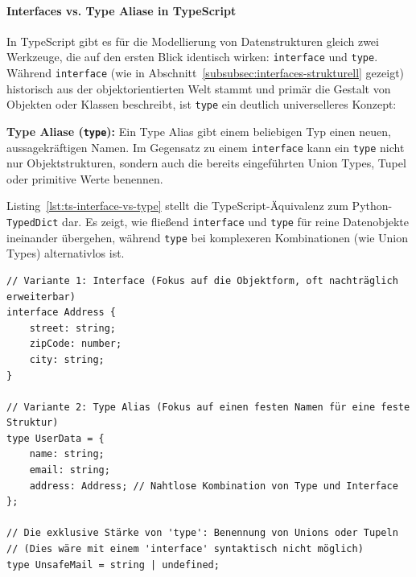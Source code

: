 \paragraph{Interfaces vs. Type Aliase in TypeScript}
\label{par:ts-interface-vs-type}

In TypeScript gibt es für die Modellierung von Datenstrukturen gleich zwei Werkzeuge, die auf den ersten Blick identisch wirken: \texttt{interface} und \texttt{type}. Während \texttt{interface} (wie in Abschnitt~\ref{subsubsec:interfaces-strukturell} gezeigt) historisch aus der objektorientierten Welt stammt und primär die Gestalt von Objekten oder Klassen beschreibt, ist \texttt{type} ein deutlich universelleres Konzept:

\begin{definition}
\label{def:ts-type-alias}
\textbf{Type Aliase (\texttt{type}):} Ein Type Alias gibt einem beliebigen Typ einen neuen, aussagekräftigen Namen. Im Gegensatz zu einem \texttt{interface} kann ein \texttt{type} nicht nur Objektstrukturen, sondern auch die bereits eingeführten Union Types, Tupel oder primitive Werte benennen.
\end{definition}

Listing~\ref{lst:ts-interface-vs-type} stellt die TypeScript-Äquivalenz zum Python-\texttt{TypedDict} dar. Es zeigt, wie fließend \texttt{interface} und \texttt{type} für reine Datenobjekte ineinander übergehen, während \texttt{type} bei komplexeren Kombinationen (wie Union Types) alternativlos ist.

\begin{listing}[htbp]
    \caption{Objektstrukturen und Aliase: \texttt{interface} und \texttt{type} in TypeScript}
    \label{lst:ts-interface-vs-type}
    \begin{verbatim}
// Variante 1: Interface (Fokus auf die Objektform, oft nachträglich erweiterbar)
interface Address {
    street: string;
    zipCode: number;
    city: string;
}

// Variante 2: Type Alias (Fokus auf einen festen Namen für eine feste Struktur)
type UserData = {
    name: string;
    email: string;
    address: Address; // Nahtlose Kombination von Type und Interface
};

// Die exklusive Stärke von 'type': Benennung von Unions oder Tupeln
// (Dies wäre mit einem 'interface' syntaktisch nicht möglich)
type UnsafeMail = string | undefined;
    \end{verbatim}
\end{listing}

